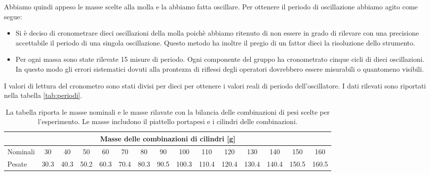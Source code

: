 Abbiamo quindi appeso le masse scelte alla molla e la abbiamo fatta oscillare.
Per ottenere il periodo di oscillazione abbiamo agito come segue:

\begin{itemize}
	\item{Si è deciso di cronometrare dieci oscillazioni della molla
        poichè abbiamo ritenuto di non essere in grado di rilevare con una precisione
        accettabile il periodo di una singola oscillazione. Questo metodo ha inoltre
        il pregio di un fattor dieci la risoluzione dello strumento.}

	\item{Per ogni massa sono state rilevate 15 misure di periodo.
        Ogni componente del gruppo ha cronometrato cinque cicli di dieci oscillazioni. 
        In questo modo gli errori sistematici dovuti alla prontezza di riflessi degli
        operatori dovrebbero essere misurabili o quantomeno visibili.}
\end{itemize}

I valori di lettura del cronometro sono stati divisi per dieci per ottenere i valori reali di periodo dell'oscillatore.
I dati rilevati sono riportati nella tabella \ref{tab:periodi}.

\begin{table}[b]
    \centering
    \footnotesize
    \begin{tabular}{l | c c c c c c c c c c c c c c}
        \multicolumn{15}{c}{Masse delle combinazioni di cilindri [g]} \\[1mm]
        \toprule
        Nominali & 30 & 40 & 50 & 60 & 70 & 80& 90 & 100 & 110 & 120 & 130 & 140 & 150 & 160 \\
        Pesate & 30.3 & 40.3 & 50.2 & 60.3 & 70.4 & 80.3 & 90.5 & 100.3 & 110.4 & 120.4 & 130.4 & 140.4 & 150.5 & 160.5 \\
        \bottomrule
    \end{tabular}
    \caption{La tabella riporta le masse nominali e le masse rilavate con la bilancia delle combinazioni di pesi scelte per
    l'esperimento. Le masse includono il piattello portapesi e i cilindri delle combinazioni.}
    \label{tab:masse_dinamico}
\end{table}

